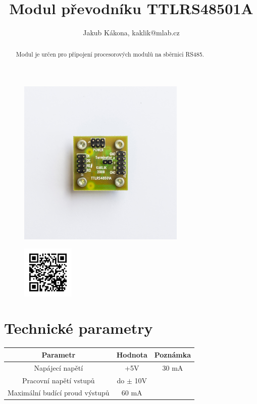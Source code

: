 \documentclass[12pt,a4paper,oneside]{article}
\begin{document}
\title{Modul převodníku TTLRS48501A}
\author{Jakub Kákona, kaklik@mlab.cz}
\maketitle

\thispagestyle{empty}
\begin{abstract}
Modul je určen pro připojení procesorových modulů na sběrnici RS485.
\end{abstract}

\begin{figure} [htbp]
\begin{center}
\includegraphics [width=80mm] {./img/TTLRS48501A_Top_Big.JPG} 
\end{center}
\end{figure}

\begin{figure} [b]
\includegraphics [width=25mm] {./img/TTLRS48501A_QRcode.png} 
\end{figure}

\newpage
\tableofcontents


\section{Technické parametry}
\begin{table}[htbp]
\begin{center}
\begin{tabular}{|c|c|c|}
\hline
\multicolumn{1}{|c|}{Parametr} & \multicolumn{1}{|c|}{Hodnota} & \multicolumn{1}{|c|}{Poznámka} \\ \hline
Napájecí napětí & +5V &  30 mA \\ \hline
Pracovní napětí  vstupů & do $\pm$ 10V &  \\ \hline
Maximální budící proud výstupů & 60 mA & \\ \hline
\end{tabular}
\end{center}
\end{table}
\end{document}

